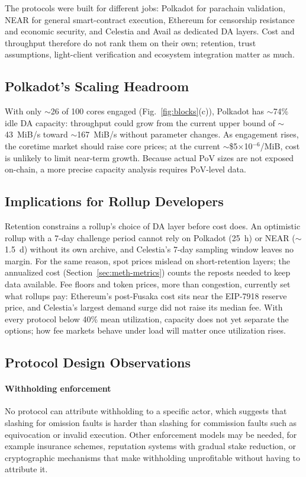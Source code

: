 The protocols were built for different jobs: Polkadot for parachain validation, NEAR for general smart-contract execution, Ethereum for censorship resistance and economic security, and Celestia and Avail as dedicated DA layers.
Cost and throughput therefore do not rank them on their own; retention, trust assumptions, light-client verification and ecosystem integration matter as much.

\subsection{Polkadot's Scaling Headroom}
\label{sec:disc-polkadot}
With only $\sim$26 of 100 cores engaged (Fig.~\ref{fig:blocks}(c)), Polkadot has $\sim$74\% idle DA capacity: throughput could grow from the current upper bound of $\sim$43~MiB/s toward $\sim$167~MiB/s without parameter changes.
As engagement rises, the coretime market should raise core prices; at the current $\sim$\$5$\times$10$^{-6}$/MiB, cost is unlikely to limit near-term growth.
Because actual PoV sizes are not exposed on-chain, a more precise capacity analysis requires PoV-level data.

\subsection{Implications for Rollup Developers}
\label{sec:disc-rollups}

Retention constrains a rollup's choice of DA layer before cost does.
An optimistic rollup with a 7-day challenge period cannot rely on Polkadot (25~h) or NEAR ($\sim$1.5~d) without its own archive, and Celestia's 7-day sampling window leaves no margin.
For the same reason, spot prices mislead on short-retention layers; the annualized cost (Section~\ref{sec:meth-metrics}) counts the reposts needed to keep data available.
Fee floors and token prices, more than congestion, currently set what rollups pay: Ethereum's post-Fusaka cost sits near the EIP-7918 reserve price, and Celestia's largest demand surge did not raise its median fee.
With every protocol below 40\% mean utilization, capacity does not yet separate the options; how fee markets behave under load will matter once utilization rises.

\subsection{Protocol Design Observations}
\label{sec:disc-design}

\paragraph{Withholding enforcement}
No protocol can attribute withholding to a specific actor, which suggests that slashing for omission faults is harder than slashing for commission faults such as equivocation or invalid execution.
Other enforcement models may be needed, for example insurance schemes, reputation systems with gradual stake reduction, or cryptographic mechanisms that make withholding unprofitable without having to attribute it.

